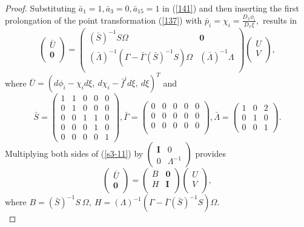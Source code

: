 \documentclass[12pt]{article}
\begin{document}
\begin{proof}
Substituting $\bar{a}_1=1, \bar{a}_3=0,\bar{a}_{15}=1$ in (\ref{141}) and then inserting the first prolongation of the point transformation (\ref{137}) with $\bar{p}_i=\chi_i=\frac{D_x\phi_i}{D_x\xi},$ results in
\begin{equation}\label{s3-11}
\begin{pmatrix}
\bar{U}\\
\textbf{0}\\
\end{pmatrix}=
\begin{pmatrix}
(\bar{S})^{-1}S\Omega&\textbf{0}\\
(\bar{\Lambda})^{-1}(\Gamma-\bar{\Gamma}(\bar{S})^{-1}S)\Omega&(\bar{\Lambda})^{-1}\Lambda\\
\end{pmatrix}\begin{pmatrix}
U\\
V\\
\end{pmatrix},
\end{equation}
where $\bar{U}=(d\phi_i-\chi_id\xi,~d\chi_i-\bar{f}^id\xi, ~d\xi)^{T}$ and
\begin{equation}
\bar{S}=\begin{pmatrix}
1&1&0&0&0\\
0&1&0&0&0\\
0&0&1&1&0\\
0&0&0&1&0\\
0&0&0&0&1
\end{pmatrix}, \bar{\Gamma}=\begin{pmatrix}
0&0&0&0&0\\
0&0&0&0&0\\
0&0&0&0&0\\
\end{pmatrix}, \bar{\Lambda}=\begin{pmatrix}
1&0&2\\
0&1&0\\
0&0&1
\end{pmatrix}.
\end{equation}
 Multiplying both sides of (\ref{s3-11}) by $\begin{pmatrix}
\mathbf{I}&0\\
0&\Lambda^{-1}\end{pmatrix}$  provides
\begin{equation}\label{142}
\begin{pmatrix}
\bar{U}\\
\textbf{0}\\
\end{pmatrix}=
\begin{pmatrix}
B&\textbf{0}\\
H&\textbf{I}\\
\end{pmatrix}\begin{pmatrix}
U\\
V\\
\end{pmatrix},
\end{equation}
where $B=(\bar{S})^{-1}S~\Omega, ~H=(\Lambda)^{-1}(\Gamma-\bar{\Gamma}(\bar{S})^{-1}S)\Omega$.\\


\end{proof}
\end{document}

